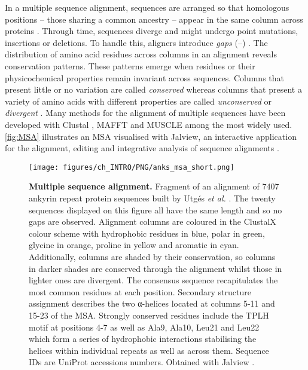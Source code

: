 In a multiple sequence alignment, sequences are arranged so that homologous positions -- those sharing a common ancestry -- appear in the same column across proteins \cite{NEEDLEMAN_1970_MSA}. Through time, sequences diverge and might undergo point mutations, insertions or deletions. To handle this, aligners introduce \textit{gaps} (--) \cite{SMITH_1981_MSA}. The distribution of amino acid residues across columns in an alignment reveals conservation patterns. These patterns emerge when residues or their physicochemical properties remain invariant across sequences. Columns that present little or no variation are called \textit{conserved} whereas columns that present a variety of amino acids with different properties are called \textit{unconserved} or \textit{divergent} \cite{LIVINGSTONE_1993_CONS}. Many methods for the alignment of multiple sequences have been developed with Clustal \cite{HIGGINS_1988_CLUSTAL, HIGGINS_1992_CLUSTALV, THOMPSON_1994_CLUSTALW, JEANMOUGIN_1998_CLUSTALX, SIEVERS_2011_CLUSTALO}, MAFFT \cite{KATOH_2002_MAFFT, KATOH_2008_MAFFT, KATOH_2013_MAFFT} and MUSCLE \cite{EDGAR_2004_MUSCLE, EDGAR_2022_MUSCLE5} among the most widely used. \autoref{fig:MSA} illustrates an MSA visualised with Jalview, an interactive application for the alignment, editing and integrative analysis of sequence alignments \cite{WATERHOUSE_2009_JALVIEW}.

\begin{figure}[htb!]
    \centering
    \texttt{[image: figures/ch\_INTRO/PNG/anks\_msa\_short.png]}
    \caption[Multiple sequence alignment]{\textbf{Multiple sequence alignment.} Fragment of an alignment of 7407 ankyrin repeat protein sequences built by Utgés \textit{et al.} \cite{UTGES_2021_ANKS}. The twenty sequences displayed on this figure all have the same length and so no gaps are observed. Alignment columns are coloured in the ClustalX colour scheme \cite{JEANMOUGIN_1998_CLUSTALX} with hydrophobic residues in blue, polar in green, glycine in orange, proline in yellow and aromatic in cyan. Additionally, columns are shaded by their conservation, so columns in darker shades are conserved through the alignment whilst those in lighter ones are divergent. The consensus sequence recapitulates the most common residues at each position. Secondary structure assignment describes the two α-helices located at columns 5-11 and 15-23 of the MSA. Strongly conserved residues include the TPLH motif at positions 4-7 as well as Ala9, Ala10, Leu21 and Leu22 which form a series of hydrophobic interactions stabilising the helices within individual repeats as well as across them. Sequence IDs are UniProt accessions numbers. Obtained with Jalview \cite{WATERHOUSE_2009_JALVIEW}.}
    \label{fig:MSA}
\end{figure}

